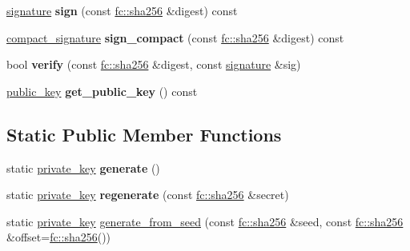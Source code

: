 \begin{DoxyCompactItemize}
\mbox{\hyperlink{classfc_1_1array}{signature}} {\bfseries sign} (const \mbox{\hyperlink{classfc_1_1sha256}{fc\+::sha256}} \&digest) const
\item 
\mbox{\label{classfc_1_1crypto_1_1r1_1_1private__key_a9f54b768f15f9685167c846e2cdcd61e}} 
\mbox{\hyperlink{classfc_1_1array}{compact\+\_\+signature}} {\bfseries sign\+\_\+compact} (const \mbox{\hyperlink{classfc_1_1sha256}{fc\+::sha256}} \&digest) const
\item 
\mbox{\label{classfc_1_1crypto_1_1r1_1_1private__key_a19c3aa0fe2010a05a5b6c86450b27dcb}} 
bool {\bfseries verify} (const \mbox{\hyperlink{classfc_1_1sha256}{fc\+::sha256}} \&digest, const \mbox{\hyperlink{classfc_1_1array}{signature}} \&sig)
\item 
\mbox{\label{classfc_1_1crypto_1_1r1_1_1private__key_a99a8502bdd1abc670c779247d606b671}} 
\mbox{\hyperlink{classfc_1_1crypto_1_1r1_1_1public__key}{public\+\_\+key}} {\bfseries get\+\_\+public\+\_\+key} () const
\end{DoxyCompactItemize}
\subsection*{Static Public Member Functions}
\begin{DoxyCompactItemize}
\item 
\mbox{\label{classfc_1_1crypto_1_1r1_1_1private__key_ad71aa7d73e57ef9fd7648fb7461177fb}} 
static \mbox{\hyperlink{classfc_1_1crypto_1_1r1_1_1private__key}{private\+\_\+key}} {\bfseries generate} ()
\item 
\mbox{\label{classfc_1_1crypto_1_1r1_1_1private__key_abed020ddf6cc239edccce96dbbdb4238}} 
static \mbox{\hyperlink{classfc_1_1crypto_1_1r1_1_1private__key}{private\+\_\+key}} {\bfseries regenerate} (const \mbox{\hyperlink{classfc_1_1sha256}{fc\+::sha256}} \&secret)
\item 
static \mbox{\hyperlink{classfc_1_1crypto_1_1r1_1_1private__key}{private\+\_\+key}} \mbox{\hyperlink{classfc_1_1crypto_1_1r1_1_1private__key_a809607decbd4c04217994a2a5d225dc7}{generate\+\_\+from\+\_\+seed}} (const \mbox{\hyperlink{classfc_1_1sha256}{fc\+::sha256}} \&seed, const \mbox{\hyperlink{classfc_1_1sha256}{fc\+::sha256}} \&offset=\mbox{\hyperlink{classfc_1_1sha256}{fc\+::sha256}}())
\end{DoxyCompactItemize}

